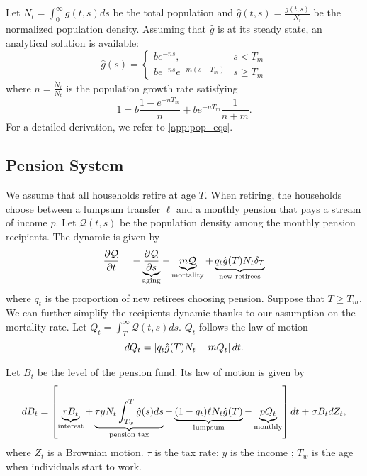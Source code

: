 \documentclass[a4paper, 12pt]{article}
\begin{document}
Let $N_t = \int_0^\infty g(t, s)ds$ be the total population and $\hat{g}(t, s)
= \frac{g(t, s)}{N_t}$ be the normalized population density. Assuming that $\hat{g}$ 
is at its steady state, an analytical solution is available: 
\begin{equation}
    \hat{g}(s) = \begin{cases}
        be^{-ns}, & s < T_m \\ 
        be^{-ns}e^{-m(s-T_m)} & s\geq T_m
    \end{cases}
\end{equation}
where $n = \frac{\dot{N}_t}{N_t}$ is the population growth rate satisfying
\begin{equation}
    1 = b\frac{1 - e^{-nT_m}}{n} + be^{-nT_m}\frac{1}{n+m}.
\end{equation}
For a detailed derivation, we refer to \cref{app:pop_eqs}. 

\subsection{Pension System}
We assume that all households retire at age $T$. When retiring, the households 
choose between a lumpsum transfer $\ell$ and a monthly pension that pays a stream 
of income $p$. Let $\mathcal{Q}(t, s)$ be the population density among the monthly pension 
recipients. The dynamic is given by 
\begin{equation}
    \frac{\partial{\mathcal{Q}}}{\partial{t}} = -\underbrace{\frac{\partial{\mathcal{Q}}}{\partial{s}}}_{\text{aging}} - \underbrace{m\mathcal{Q}}_{\text{mortality}} + \underbrace{q_t\hat{g}(T)N_t\delta_T}_{\text{new retirees}}
\end{equation} 
where $q_t$ is the proportion of new retirees choosing pension. Suppose that 
$T\geq T_m$. We can further simplify the recipients dynamic thanks to our 
assumption on the mortality rate. Let $Q_t = \int_T^\infty \mathcal{Q}(t, s)ds$. 
$Q_t$ follows the law of motion 
\begin{equation}
    dQ_t = \left[ {q_t\hat{g}(T)N_t - mQ_t} \right]dt. 
\end{equation}  

Let $B_t$ be the level of the pension fund. Its law of motion is given by 
\begin{equation}
    dB_t = \left[ {\underbrace{rB_t}_{\text{interest}} + \underbrace{\tau yN_t\int_{T_w}^T\hat{g}(s)ds}_{\text{pension tax}} - \underbrace{(1-q_t)\ell N_t\hat{g}(T)}_{\text{lumpsum}} - \underbrace{pQ_t}_{\text{monthly}}} \right]dt + \sigma B_tdZ_t,  
\end{equation}
where $Z_t$ is a Brownian motion. $\tau$ is the tax rate; $y$ is the income 
; $T_w$ is the age when individuals start to work. 
\end{document}

